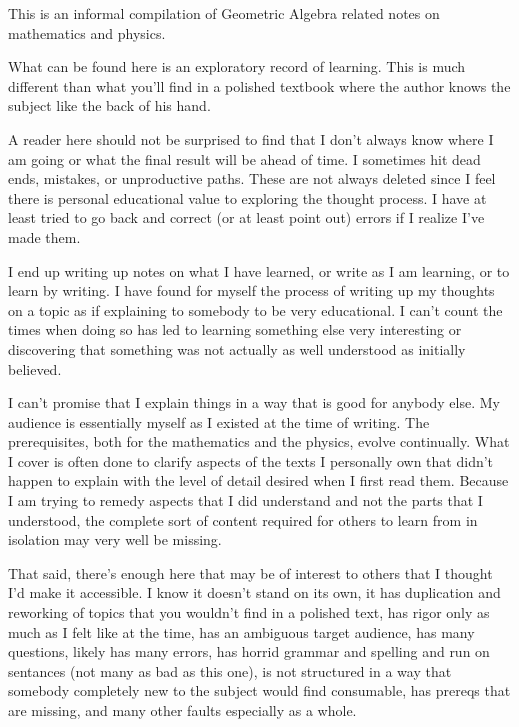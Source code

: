 This is an informal compilation of Geometric Algebra related notes on
mathematics and physics.

What can be found here is an exploratory record of learning.  This is much different than what you'll find in a polished textbook where the author knows the subject like the back of his hand.  

A reader here should not be surprised to find that I don't always know where I am going or what the final result will be ahead of time.  I sometimes hit dead ends, mistakes, or unproductive paths.  These are not always deleted since I feel there is personal educational value to exploring the thought process.  I have at least tried to go back and correct (or at least point out) errors if I realize I've made them.

I end up writing up notes on what I have learned, or write as I am learning, or to learn by writing.  I have found for myself the process of writing up 
my thoughts on a topic as if explaining to somebody to be very educational.
I can't count the times when doing so has led to learning something else very interesting or discovering that something was not actually as well understood as initially believed.

I can't promise that I explain things in a way that is good for anybody else.  My audience is essentially myself as I existed at the time of writing.  The prerequisites, both for the mathematics and the physics, evolve continually.  What I cover is often done to clarify aspects of the texts I personally own that didn't happen to explain with the level of detail desired when I first read them.  Because I am trying to remedy aspects that I did understand and not the parts that I understood, the complete sort of content required for others to learn from in isolation may very well be missing.


That said, there's enough here that may be of interest to others that
I thought I'd make it accessible.  I know it doesn't stand on its own,
it has duplication and reworking of topics that you wouldn't find in a
polished text, has rigor only as much as I felt like at the time, has
an ambiguous target audience,
has many questions, likely has
many errors, has horrid grammar and spelling and run on sentances (not
many as bad as this one),
is not structured in a
way that somebody completely new to the subject would find consumable,
has prereqs that are missing, and many other faults especially as a
whole.

